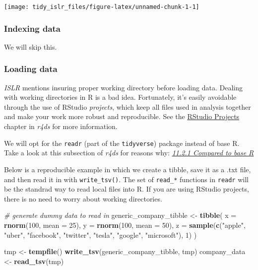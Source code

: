 \documentclass[]{book}
\newenvironment{Shaded}{\begin{snugshade}}{\end{snugshade}}
\newcommand{\KeywordTok}[1]{\textcolor[rgb]{0.13,0.29,0.53}{\textbf{#1}}}
\newcommand{\DataTypeTok}[1]{\textcolor[rgb]{0.13,0.29,0.53}{#1}}
\newcommand{\DecValTok}[1]{\textcolor[rgb]{0.00,0.00,0.81}{#1}}
\newcommand{\StringTok}[1]{\textcolor[rgb]{0.31,0.60,0.02}{#1}}
\newcommand{\CommentTok}[1]{\textcolor[rgb]{0.56,0.35,0.01}{\textit{#1}}}
\newcommand{\NormalTok}[1]{#1}
\theoremstyle{definition}
\theoremstyle{definition}
\theoremstyle{definition}
\theoremstyle{remark}
\begin{document}
\begin{center}\texttt{[image: tidy\_islr\_files/figure-latex/unnamed-chunk-1-1]} \end{center}

\subsubsection{Indexing data}\label{indexing-data}

We will skip this.

\subsubsection{Loading data}\label{loading-data}

\emph{ISLR} mentions insuring proper working directory before loading
data. Dealing with working directories in R is a bad idea. Fortunately,
it's easily avoidable through the use of RStudio \emph{projects}, which
keep all files used in analysis together and make your work more robust
and reproducible. See the
\href{http://r4ds.had.co.nz/workflow-projects.html}{RStudio Projects}
chapter in \emph{r4ds} for more information.

We will opt for the \texttt{readr} (part of the \texttt{tidyverse})
package instead of base R. Take a look at this subsection of \emph{r4ds}
for reasons why:
\href{http://r4ds.had.co.nz/data-import.html}{\emph{11.2.1 Compared to
base R}}

Below is a reproducible example in which we create a tibble, save it as
a .txt file, and then read it in with \texttt{write\_tsv()}. The set of
\texttt{read\_*} functions in \texttt{readr} will be the standrad way to
read local files into R. If you are using RStudio projects, there is no
need to worry about working directories.

\begin{Shaded}
\begin{Highlighting}[]
\CommentTok{# generate dummy data to read in}
\NormalTok{generic_company_tibble <-}\StringTok{ }\KeywordTok{tibble}\NormalTok{(}
  \DataTypeTok{x =} \KeywordTok{rnorm}\NormalTok{(}\DecValTok{100}\NormalTok{, }\DataTypeTok{mean =} \DecValTok{25}\NormalTok{),}
  \DataTypeTok{y =} \KeywordTok{rnorm}\NormalTok{(}\DecValTok{100}\NormalTok{, }\DataTypeTok{mean =} \DecValTok{50}\NormalTok{),}
  \DataTypeTok{z =} \KeywordTok{sample}\NormalTok{(}\KeywordTok{c}\NormalTok{(}\StringTok{"apple"}\NormalTok{, }\StringTok{"uber"}\NormalTok{, }\StringTok{"facebook"}\NormalTok{, }\StringTok{"twitter"}\NormalTok{, }\StringTok{"tesla"}\NormalTok{, }\StringTok{"google"}\NormalTok{, }\StringTok{"microsoft"}\NormalTok{), }\DecValTok{1}\NormalTok{)}
\NormalTok{)}

\NormalTok{tmp <-}\StringTok{ }\KeywordTok{tempfile}\NormalTok{()}
\KeywordTok{write_tsv}\NormalTok{(generic_company_tibble, tmp)}
\NormalTok{company_data <-}\StringTok{ }\KeywordTok{read_tsv}\NormalTok{(tmp)}
\end{Highlighting}
\end{Shaded}
\end{document}
